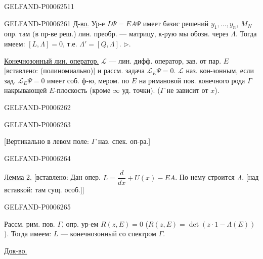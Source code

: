 \begin{GelfandAdjacentEvidence}{GELFAND-P000625}{11}

\end{GelfandAdjacentEvidence}



\begin{GelfandAdjacentEvidence}{GELFAND-P000626}{1}
\underline{Д-во.} Ур-е \(L\Psi=EA\Psi\) имеет базис решений
\(y_1,\ldots,y_n\), \(M_N\) опр. там
(в пр-ве реш.) лин. преобр. --- матрицу,
к-рую мы обозн. через \(\Lambda\). Тогда имеем: \([L,\Lambda]=0\),
т.е. \(\Lambda'=[Q,\Lambda]\). \(\triangleright\).

\underline{Конечнозонный лин. оператор.} \(\mathcal L\) --- лин. дифф. оператор,
зав. от пар. \(E\) [вставлено: (полиномиально)] и рассм. задача
\(\mathcal L_E\Psi=0\).
\(\mathcal L\) наз. кон-зонным, если зад. \(\mathcal L_E\Psi=0\)
имеет соб. ф-ю, мером. по \(E\) на римановой пов. конечного рода \(\Gamma\)
накрывающей \(E\)-плоскость (кроме \(\infty\) уд. точки).
(\(\Gamma\) не зависит от \(x\)).
\end{GelfandAdjacentEvidence}
\begin{GelfandAdjacentEvidence}{GELFAND-P000626}{2}

\end{GelfandAdjacentEvidence}
\begin{GelfandAdjacentEvidence}{GELFAND-P000626}{3}

[Вертикально в левом поле: \(\Gamma\) наз. спек. оп-ра.]
\end{GelfandAdjacentEvidence}
\begin{GelfandAdjacentEvidence}{GELFAND-P000626}{4}


\underline{Лемма 2.}
[вставлено: Дан опер. \(L=\dfrac{d}{dx}+U(x)-EA\).
По нему строится \(\Lambda\). [над вставкой: там сущ. особ.]]
\end{GelfandAdjacentEvidence}
\begin{GelfandAdjacentEvidence}{GELFAND-P000626}{5}

Рассм. рим. пов. \(\Gamma\), опр. ур-ем \(R(z,E)=0\)
(\(R(z,E)=\det(z\cdot1-\Lambda(E))\)).
Тогда имеем: \(L\) --- конечнозонный со спектром \(\Gamma\).

\underline{Док-во.}
\end{GelfandAdjacentEvidence}
